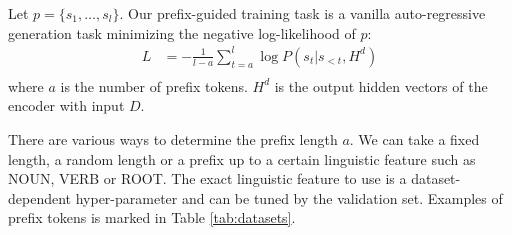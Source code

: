 Let $p=\{s_1, \ldots, s_l\}$. 
Our prefix-guided training task is a vanilla auto-regressive generation
task minimizing the negative log-likelihood of $p$:
\begin{equation}
	\begin{aligned}
		L &= -\frac{1}{l-a}\sum_{t=a}^{l}\log P(s_t|s_{<t},H^d) \\
	\end{aligned}
\end{equation}
where $a$ is the number of prefix tokens. $H^d$ is the output hidden vectors of the encoder with input $D$.

%

There are various ways to determine the prefix length $a$. We can take
a fixed length, a random length or a prefix up to a certain linguistic feature
such as NOUN, VERB or ROOT. 
The exact linguistic feature to use is a dataset-dependent hyper-parameter and 
can be tuned by the validation set. Examples of prefix tokens is marked in Table \ref{tab:datasets}.


